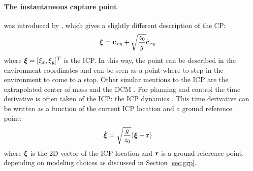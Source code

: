 \paragraph{The instantaneous capture point} was introduced by \cite{koolen2012capturability}, which gives a slightly different description of the \ac{CP}:
\begin{equation}
\boldsymbol{\xi}=\mathbf{c}_{xy}+\sqrt{\frac{z_0}{g}}\dot{\mathbf{c}}_{xy} 
\label{eq:icp}
\end{equation}
where $\boldsymbol{\xi}=[\xi_x, \xi_y]^T$ is the \ac{ICP}. In this way, the point can be described in the environment coordinates and can be seen as a point where to step in the environment to come to a stop. Other similar mentions to the \ac{ICP} are the extrapolated center of mass \cite{hof2008extrapolated} and the \ac{DCM} \cite{takenaka2009real}. 
\paraskip
For planning and control the time derivative is often taken of the \ac{ICP}: the \ac{ICP} dynamics \cite{koolen2012capturability}. This time derivative can be written as a function of the current \ac{ICP} location and a ground reference point:
\begin{equation}\label{eq:icpdyn}
\dot{\boldsymbol{\xi}}=\sqrt{ \frac{g}{z_0}}(\boldsymbol{\xi}-\mathbf{r})
\end{equation}
where $\boldsymbol{\xi}$ is the \ac{2D} vector of the \ac{ICP} location and $\mathbf{r}$ is a ground reference point, depending on modeling choices as discussed in Section \ref{sec:grp}.



